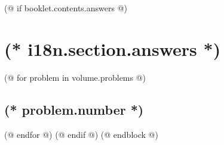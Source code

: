     (@ if booklet.contents.answers @)
        \section{(* i18n.section.answers *)}
        \pagestyle{answers}
        (@ for problem in volume.problems @)%
            \setcounter{problem}{(* problem.number *)}%
            \subsection{\texorpdfstring{(* problem.number *)}{(* problem.number *). (* problem.id *)}}%
            \label{ssc:answer-(* problem.id*)}%
        (@ endfor @)
    (@ endif @)
(@ endblock @)
